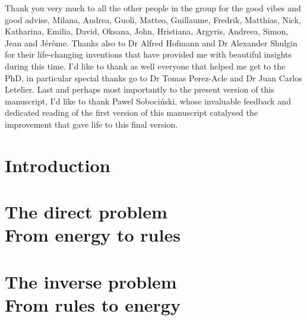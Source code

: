 \documentclass[phd,lfcs]{infthesis}
\begin{document}
\begin{preliminary}
\begin{acknowledgements}
  Thank you very much to all the other people in the group
  for the good vibes and good advise,
  Milana, Andrea, Guoli, Matteo, Guillaume, Fredrik, Matthias, Nick,
  Katharina, Emilia, David, Oksana, John, Hristiana,
  Argyris, Andreea, Simon, Jean and J\'er\^ome.
  Thanks also to Dr Alfred Hofmann and Dr Alexander Shulgin
  for their life-changing inventions that have provided me
  with beautiful insights during this time.
  I'd like to thank as well everyone that helped me get to the PhD,
  in particular special thanks go to Dr Tomas Perez-Acle
  and Dr Juan Carlos Letelier. %
  Last and perhaps most importantly to the present version
  of this manuscript, I'd like to thank Pawel Sobociński,
  whose invaluable feedback and dedicated reading of the first
  version of this manuscript catalysed %
  the improvement that gave life to this final version.
\end{acknowledgements}
\fi

\standarddeclaration


\tableofcontents


\end{preliminary}

\chapter{Introduction}
\label{chp:intro}


\chapter[The direct problem: From energy to rules]{
  The direct problem \\
  \LARGE From energy to rules}
\label{chp:direct}


\chapter[The inverse problem: From rules to energy]{
  The inverse problem \\
  \LARGE From rules to energy}
\label{chp:inverse}
% 
\end{document}
